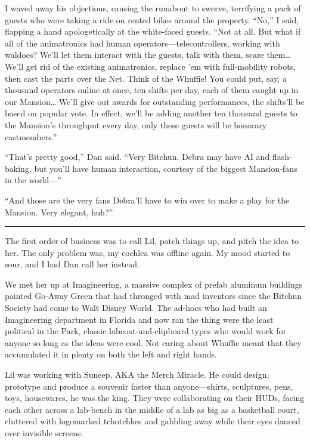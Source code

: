 I waved away his objections, causing the runabout to swerve,
terrifying a pack of guests who were taking a ride on rented bikes
around the property. “No,” I said, flapping a hand apologetically
at the white-faced guests. “Not at all. But what if all of the
animatronics had human operators—telecontrollers, working with
waldoes? We'll let them interact with the guests, talk with them,
scare them… We'll get rid of the existing animatronics, replace 'em
with full-mobility robots, then cast the parts over the Net. Think
of the Whuffie! You could put, say, a thousand operators online at
once, ten shifts per day, each of them caught up in our Mansion…
We'll give out awards for outstanding performances, the shifts'll
be based on popular vote. In effect, we'll be adding another ten
thousand guests to the Mansion's throughput every day, only these
guests will be honorary castmembers.”

“That's pretty good,” Dan said. “Very Bitchun. Debra may have AI
and flash-baking, but you'll have human interaction, courtesy of
the biggest Mansion-fans in the world—”

“And those are the very fans Debra'll have to win over to make a
play for the Mansion. Very elegant, huh?”

\begin{center}\rule{3in}{0.4pt}\end{center}

The first order of business was to call Lil, patch things up, and
pitch the idea to her. The only problem was, my cochlea was offline
again. My mood started to sour, and I had Dan call her instead.

We met her up at Imagineering, a massive complex of prefab aluminum
buildings painted Go-Away Green that had thronged with mad
inventors since the Bitchun Society had come to Walt Disney World.
The ad-hocs who had built an Imagineering department in Florida and
now ran the thing were the least political in the Park, classic
labcoat-and-clipboard types who would work for anyone so long as
the ideas were cool. Not caring about Whuffie meant that they
accumulated it in plenty on both the left and right hands.

Lil was working with Suneep, AKA the Merch Miracle. He could
design, prototype and produce a souvenir faster than anyone—shirts,
sculptures, pens, toys, housewares, he was the king. They were
collaborating on their HUDs, facing each other across a lab-bench
in the middle of a lab as big as a basketball court, cluttered with
logomarked tchotchkes and gabbling away while their eyes danced
over invisible screens.

